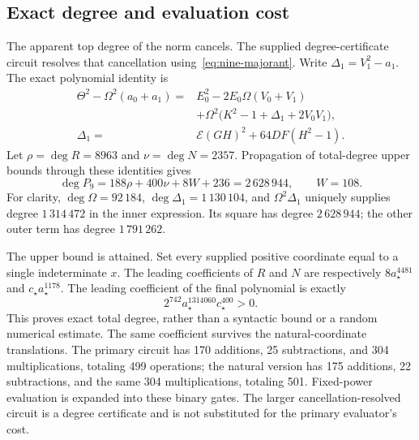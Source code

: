 \subsection{Exact degree and evaluation cost}
The apparent top degree of the norm cancels. The supplied degree-certificate
circuit resolves that cancellation using~\eqref{eq:nine-majorant}. Write
$\Delta_1=V_1^2-a_1$. The exact polynomial identity is
\begin{align*}
 \Theta^2-\Omega^2(a_0+a_1)
 ={}&E_0^2-2E_0\Omega(V_0+V_1)\\
 &+\Omega^2\bigl(K^2-1+\Delta_1+2V_0V_1\bigr),\\
 \Delta_1={}&\mathcal E(GH)^2+64DF(H^2-1).
\end{align*}
Let $\rho=\deg R=8963$ and $\nu=\deg N=2357$. Propagation of total-degree
upper bounds through these identities gives
\[
 \deg P_9=188\rho+400\nu+8W+236=2\,628\,944,
 \qquad W=108.
\]
For clarity, $\deg\Omega=92\,184$, $\deg\Delta_1=1\,130\,104$, and
$\Omega^2\Delta_1$ uniquely supplies degree $1\,314\,472$ in the inner
expression. Its square has degree $2\,628\,944$; the other outer term has
degree $1\,791\,262$.

The upper bound is attained. Set every supplied positive coordinate equal
to a single indeterminate $x$. The leading coefficients of $R$ and $N$
are respectively $8a_\star^{4481}$ and $c_\star a_\star^{1178}$.
The leading coefficient of the final polynomial is exactly
\[
 \boxed{2^{742}a_\star^{1314060}c_\star^{400}>0.}
\]
This proves exact total degree, rather than a syntactic bound or a random
numerical estimate. The same coefficient survives the natural-coordinate
translations. The primary circuit has 170 additions, 25 subtractions,
and 304 multiplications, totaling 499 operations; the natural version has
175 additions, 22 subtractions, and the same 304 multiplications, totaling
501. Fixed-power evaluation is expanded into these binary gates. The
larger cancellation-resolved circuit is a degree certificate and is not
substituted for the primary evaluator's cost.
